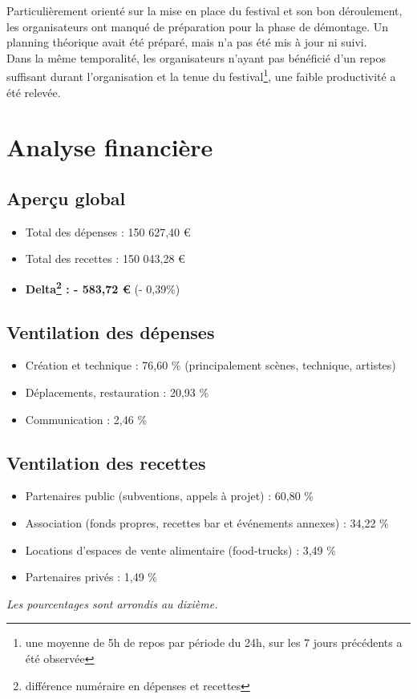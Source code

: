 \documentclass[12pt,a4paper]{report}
\begin{document}
Particulièrement orienté sur la mise en place du festival et son bon déroulement, les organisateurs ont manqué de préparation pour la phase de démontage. Un planning théorique avait été préparé, mais n'a pas été mis à jour ni suivi.\\

Dans la même temporalité, les organisateurs n'ayant pas bénéficié d'un repos suffisant durant l'organisation et la tenue du festival\footnote{une moyenne de 5h de repos par période du 24h, sur les 7 jours précédents a été observée}, une faible productivité a été relevée.

\chapter{Analyse financière}

\section{Aperçu global}
\begin{itemize}
\item Total des dépenses : 150 627,40 €
\item Total des recettes : 150 043,28 €
\item \textbf{Delta\footnote{différence numéraire en dépenses et recettes} : - 583,72 €} (- 0,39\%)
\end{itemize}

\section{Ventilation des dépenses}
\begin{itemize}
\item Création et technique : 76,60 \% (principalement scènes, technique, artistes)
\item Déplacements, restauration : 20,93 \%
\item Communication : 2,46 \%
\end{itemize}

\section{Ventilation des recettes}
\begin{itemize}
\item Partenaires public (subventions, appels à projet) : 60,80 \%
\item Association (fonds propres, recettes bar et événements annexes) : 34,22 \%
\item Locations d'espaces de vente alimentaire (food-trucks) : 3,49 \%
\item Partenaires privés : 1,49 \%
\end{itemize}
\textit{Les pourcentages sont arrondis au dixième.}
\end{document}
